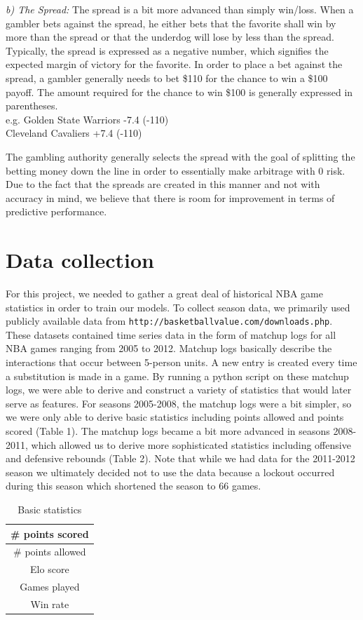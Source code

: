 \documentclass{article}
\begin{document}
\textit{b) The Spread:} The spread is a bit more advanced than simply win/loss. When a gambler bets against the spread, he either bets that the favorite shall win by more than the spread or that the underdog will lose by less than the spread. Typically, the spread is expressed as a negative number, which signifies the expected margin of victory for the favorite. In order to place a bet against the spread, a gambler generally needs to bet \$110 for the chance to win a \$100 payoff. The amount required for the chance to win \$100 is generally expressed in parentheses. \\
e.g. Golden State Warriors -7.4 (-110) \\
Cleveland Cavaliers +7.4 (-110)

The gambling authority generally selects the spread with the goal of splitting the betting money down the line in order to essentially make arbitrage with 0 risk. Due to the fact that the spreads are created in this manner and not with accuracy in mind, we believe that there is room for improvement in terms of predictive performance.

\section{Data collection}
For this project, we needed to gather a great deal of historical NBA game statistics in order to train our models. To collect season data, we primarily used publicly available data from \texttt{http://basketballvalue.com/downloads.php}.
These datasets contained time series data in the form of matchup logs for all NBA games ranging from 2005 to 2012. Matchup logs basically describe the interactions that occur between 5-person units. A new entry is created every time a substitution is made in a game. By running a python script on these matchup logs, we were able to derive and construct a variety of statistics that would later serve as features. For seasons 2005-2008, the matchup logs were a bit simpler, so we were only able to derive basic statistics including points allowed and points scored (Table 1). The matchup logs became a bit more advanced in seasons 2008-2011, which allowed us to derive more sophisticated statistics including offensive and defensive rebounds (Table 2). Note that while we had data for the 2011-2012 season we ultimately decided not to use the data because a lockout occurred during this season which shortened the season to 66 games.

\begin{table}
  \begin{center}
    \begin{tabular}{ | c |}
      \hline
		\# points scored \\ \hline
    \# points allowed \\ \hline
    Elo score \\ \hline
		Games played \\ \hline
    Win rate  \\ \hline
    \end{tabular}
  \end{center}
  \caption{Basic statistics}
\end{table}
\end{document}
